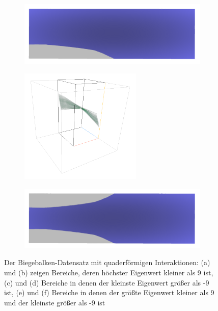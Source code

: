 \documentclass[a4paper,fontsize=12pt,toc=bib,parskip=half,ngerman]{scrartcl}
\begin{document}
\begin{figure}
\begin{subfigure}{0.4\textwidth}
		\centering
		\includegraphics[width=\textwidth]{pictures/results/Beam/Beam_Object2.png}
		\subcaption{}
		\label{BeamObject2}
	\end{subfigure}
	\medskip
	\begin{subfigure}{0.4\textwidth}
		\centering
		\includegraphics[height=5.5cm]{pictures/results/Beam/Beam_InvariantSpace3.png}
		\subcaption{}
		\label{BeamInvariant3}
	\end{subfigure}
	\hspace*{\fill}
	\begin{subfigure}{0.4\textwidth}
		\centering
		\includegraphics[width=\textwidth]{pictures/results/Beam/Beam_Object3.png}
		\subcaption{}
		\label{BeamObject3}
	\end{subfigure}
	\caption{Der Biegebalken-Datensatz mit quaderf\"ormigen Interaktionen: (a) und (b) zeigen Bereiche, deren h\"ochster Eigenwert kleiner als 9 ist, (c) und (d) Bereiche in denen der kleinste Eigenwert gr\"o{\ss}er als -9 ist, (e) und (f) Bereiche in denen der gr\"o{\ss}te Eigenwert kleiner als 9 und der kleinste gr\"o{\ss}er als -9 ist}
	\label{BeamInteraction}
\end{figure}
\end{document}
